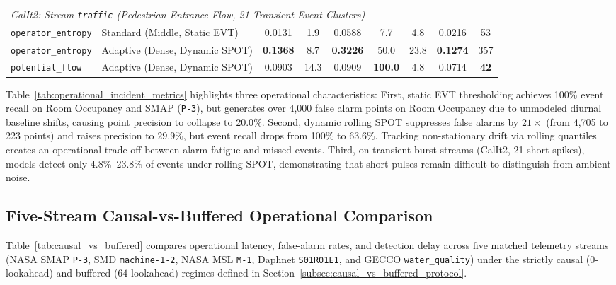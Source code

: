 \begin{table}[t]
\begin{tabular}{@{}llccccccc@{}}
\midrule
\multicolumn{9}{l}{\textit{CalIt2: Stream \texttt{traffic} (Pedestrian Entrance Flow, 21 Transient Event Clusters)}} \\
\texttt{operator\_entropy} & Standard (Middle, Static EVT) & 0.0131 & 1.9  & 0.0588 & 7.7  & 4.8  & 0.0216 & 53 \\
\texttt{operator\_entropy} & Adaptive (Dense, Dynamic SPOT) & \textbf{0.1368} & 8.7  & \textbf{0.3226} & 50.0 & 23.8 & \textbf{0.1274} & 357 \\
\texttt{potential\_flow}   & Adaptive (Dense, Dynamic SPOT) & 0.0903 & 14.3 & 0.0909 & \textbf{100.0} & 4.8  & 0.0714 & \textbf{42} \\
\bottomrule
\end{tabular}
\end{table}

Table~\ref{tab:operational_incident_metrics} highlights three operational characteristics:
First, static EVT thresholding achieves 100\% event recall on Room Occupancy and SMAP (\texttt{P-3}), but generates over 4,000 false alarm points on Room Occupancy due to unmodeled diurnal baseline shifts, causing point precision to collapse to $20.0\%$.
Second, dynamic rolling SPOT suppresses false alarms by $21\times$ (from 4,705 to 223 points) and raises precision to $29.9\%$, but event recall drops from 100\% to $63.6\%$. Tracking non-stationary drift via rolling quantiles creates an operational trade-off between alarm fatigue and missed events.
Third, on transient burst streams (CalIt2, 21 short spikes), models detect only $4.8\%\text{--}23.8\%$ of events under rolling SPOT, demonstrating that short pulses remain difficult to distinguish from ambient noise.


\subsection{Five-Stream Causal-vs-Buffered Operational Comparison}
\label{sup:causal_vs_buffered}

\label{subsec:causal_vs_buffered}

Table~\ref{tab:causal_vs_buffered} compares operational latency, false-alarm rates, and detection delay across five matched telemetry streams (NASA SMAP \texttt{P-3}, SMD \texttt{machine-1-2}, NASA MSL \texttt{M-1}, Daphnet \texttt{S01R01E1}, and GECCO \texttt{water\_quality}) under the strictly causal ($0$-lookahead) and buffered ($64$-lookahead) regimes defined in Section~\ref{subsec:causal_vs_buffered_protocol}.

